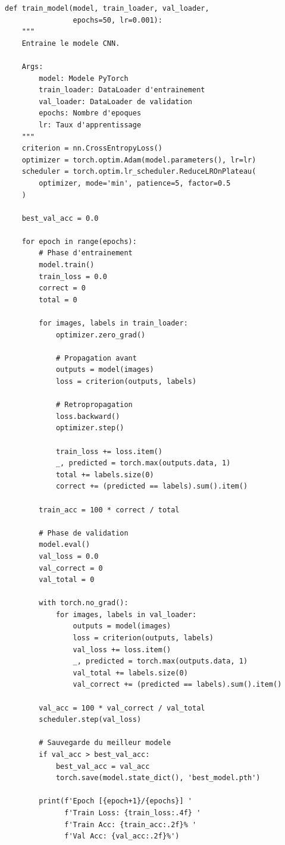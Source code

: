 \documentclass[12pt,a4paper,twoside]{report}
\begin{document}
\begin{lstlisting}[style=pythonstyle, caption={Boucle d'entraînement du CNN.}, label={lst:training}]
def train_model(model, train_loader, val_loader, 
                epochs=50, lr=0.001):
    """
    Entraine le modele CNN.
    
    Args:
        model: Modele PyTorch
        train_loader: DataLoader d'entrainement
        val_loader: DataLoader de validation
        epochs: Nombre d'epoques
        lr: Taux d'apprentissage
    """
    criterion = nn.CrossEntropyLoss()
    optimizer = torch.optim.Adam(model.parameters(), lr=lr)
    scheduler = torch.optim.lr_scheduler.ReduceLROnPlateau(
        optimizer, mode='min', patience=5, factor=0.5
    )
    
    best_val_acc = 0.0
    
    for epoch in range(epochs):
        # Phase d'entrainement
        model.train()
        train_loss = 0.0
        correct = 0
        total = 0
        
        for images, labels in train_loader:
            optimizer.zero_grad()
            
            # Propagation avant
            outputs = model(images)
            loss = criterion(outputs, labels)
            
            # Retropropagation
            loss.backward()
            optimizer.step()
            
            train_loss += loss.item()
            _, predicted = torch.max(outputs.data, 1)
            total += labels.size(0)
            correct += (predicted == labels).sum().item()
        
        train_acc = 100 * correct / total
        
        # Phase de validation
        model.eval()
        val_loss = 0.0
        val_correct = 0
        val_total = 0
        
        with torch.no_grad():
            for images, labels in val_loader:
                outputs = model(images)
                loss = criterion(outputs, labels)
                val_loss += loss.item()
                _, predicted = torch.max(outputs.data, 1)
                val_total += labels.size(0)
                val_correct += (predicted == labels).sum().item()
        
        val_acc = 100 * val_correct / val_total
        scheduler.step(val_loss)
        
        # Sauvegarde du meilleur modele
        if val_acc > best_val_acc:
            best_val_acc = val_acc
            torch.save(model.state_dict(), 'best_model.pth')
        
        print(f'Epoch [{epoch+1}/{epochs}] '
              f'Train Loss: {train_loss:.4f} '
              f'Train Acc: {train_acc:.2f}% '
              f'Val Acc: {val_acc:.2f}%')
\end{lstlisting}
\end{document}

